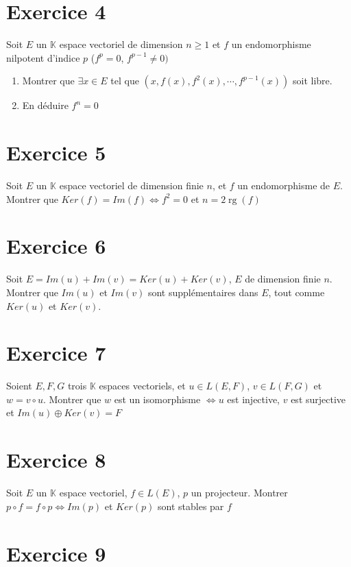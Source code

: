 \documentclass[11pt]{article}
\begin{document}
\section*{Exercice 4}

Soit $E$ un $\mathbb{K}$ espace vectoriel de dimension $n\geq 1$ et $f$ un endomorphisme nilpotent d'indice $p$ ($f^p=0$, $f^{p-1}\neq 0)$
\begin{enumerate}
\item Montrer que $\exists x\in E$ tel que $(x,f(x),f^2(x),\cdots,f^{p-1}(x))$ soit libre.
\item En déduire $f^n = 0$
\end{enumerate}

\section*{Exercice 5}

Soit $E$ un $\mathbb{K}$ espace vectoriel de dimension finie $n$, et $f$ un endomorphisme de $E$. Montrer que $Ker(f)=Im(f) \Leftrightarrow f^2=0$ et $n=2\operatorname{rg}(f)$

\section*{Exercice 6}

Soit $E =Im(u) +Im(v) = Ker(u)+Ker(v)$, $E$ de dimension finie $n$.
Montrer que $Im(u)$ et $Im(v)$ sont supplémentaires dans $E$, tout comme $Ker(u)$ et $Ker(v)$.

\section*{Exercice 7}

Soient $E,F,G$ trois $\mathbb{K}$ espaces vectoriels, et $u\in L(E,F)$, $v\in L(F,G)$ et $w=v\circ u$.
Montrer que $w$ est un isomorphisme $\Leftrightarrow u$ est injective, $v$ est surjective et $Im(u)\oplus Ker(v)=F$

\section*{Exercice 8}

Soit $E$ un $\mathbb{K}$ espace vectoriel, $f\in L(E)$, $p$ un projecteur. Montrer $p\circ f = f\circ p \Leftrightarrow Im(p)$ et $Ker(p)$ sont stables par $f$

\section*{Exercice 9}
\end{document}
